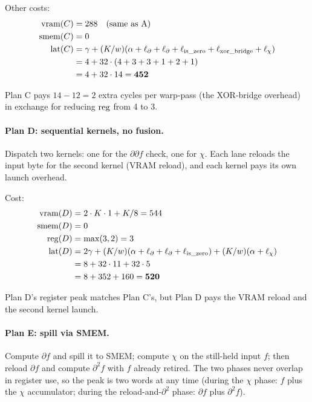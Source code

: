 Other costs:
\begin{align*}
  \operatorname{vram}(C) &= 288 \quad \text{(same as A)} \\
  \operatorname{smem}(C) &= 0 \\
  \operatorname{lat}(C)  &= \gamma + (K/w)(\alpha + \ell_\partial +
              \ell_\partial + \ell_{\text{is\_zero}} +
              \ell_{\text{xor\_bridge}} + \ell_\chi) \\
           &= 4 + 32 \cdot (4 + 3 + 3 + 1 + 2 + 1) \\
           &= 4 + 32 \cdot 14 = \mathbf{452}
\end{align*}

Plan C pays $14 - 12 = 2$ extra cycles per
warp-pass (the XOR-bridge overhead) in exchange for
reducing $\operatorname{reg}$ from 4 to 3.

\paragraph{Plan D: sequential kernels, no fusion.}
Dispatch two kernels: one for the $\partial\partial f$
check, one for $\chi$. Each lane reloads the input
byte for the second kernel (VRAM reload), and each
kernel pays its own launch overhead.

Cost:
\begin{align*}
  \operatorname{vram}(D) &= 2 \cdot K \cdot 1 + K/8 = 544 \\
  \operatorname{smem}(D) &= 0 \\
  \operatorname{reg}(D)  &= \max(3, 2) = 3 \\
  \operatorname{lat}(D)  &= 2\gamma + (K/w)(\alpha + \ell_\partial
              + \ell_\partial + \ell_{\text{is\_zero}}) +
              (K/w)(\alpha + \ell_\chi) \\
           &= 8 + 32 \cdot 11 + 32 \cdot 5 \\
           &= 8 + 352 + 160 = \mathbf{520}
\end{align*}

Plan D's register peak matches Plan C's, but Plan D
pays the VRAM reload and the second kernel launch.

\paragraph{Plan E: spill via SMEM.}
Compute $\partial f$ and spill it to SMEM; compute
$\chi$ on the still-held input $f$; then reload
$\partial f$ and compute $\partial^2 f$ with $f$
already retired. The two phases never overlap in
register use, so the peak is two words at any time
(during the $\chi$ phase: $f$ plus the $\chi$
accumulator; during the reload-and-$\partial^2$
phase: $\partial f$ plus $\partial^2 f$).

